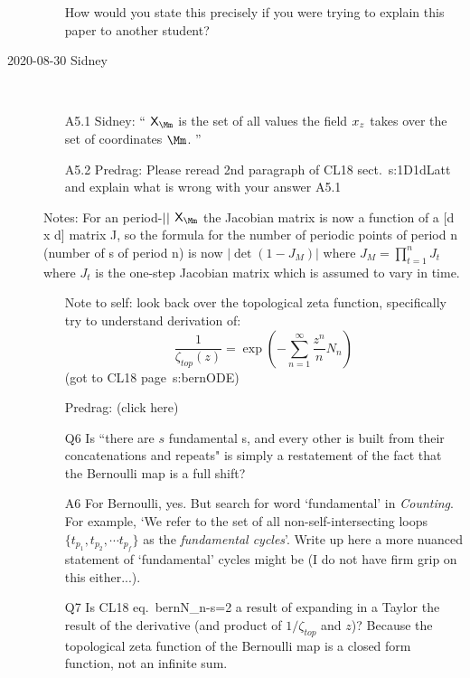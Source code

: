 \begin{description}
\begin{itemize}
How would you state this precisely if you were trying to explain this
paper to another student?
\end{itemize}

\item[2020-08-30 Sidney]~~
\begin{itemize}
  \item[A5.1]
Sidney: ``
$\Xx_\Mm$ is the set of all values the field $x_z$ takes over
the set of coordinates $\Mm$.
''
  \item[A5.2]
Predrag: Please reread 2nd paragraph of CL18 sect.~{s:1D1dLatt} and explain what
is wrong with your answer A5.1
\end{itemize}

\vspace{3mm}

Notes: For an period-${||}$ {\lattstate} $\Xx_\Mm$ the Jacobian
matrix is now a function of a [d x d] matrix J, so the formula for the
number of periodic points of period n (number of {\lattstate}s of period
n) is now $|\det(1-J_M)|$ where $J_M=\prod^n_{t=1}J_t$ where $J_t$ is the
one-step Jacobian matrix which is assumed to vary in time.

\begin{itemize}
	\item[Note to self:]
look back over the topological zeta function, specifically try to
understand derivation of:
\[
\frac{1}{\zeta_{top}(z)}=\exp\left(-\sum^{\infty}_{n=1}\frac{z^n}{n}N_n\right)
\]
(got to CL18 page~{s:bernODE})
	\item[Predrag:]
 {(click here)}
	\item[Q6]
Is ``there are ${s}$ fundamental {\lattstate}s, and every other {\lattstate}
is built from their concatenations and repeats"
is simply a restatement of the fact that the Bernoulli map is a full shift?
	\item[A6]
For Bernoulli, yes. But search for word `fundamental' in
{{\em Counting}}. For example, `We refer to the set of all
non-self-intersecting loops $\{ t_{p_1}, t_{p_2}, \cdots t_{p_f} \}$ as
the {\em fundamental cycles}'. Write up here a more nuanced statement of
`fundamental' cycles might be (I do not have firm grip on this either...).
	\item[Q7]
Is CL18 eq.~{bernN\_n-s=2} a result of expanding in a Taylor the result
of the derivative (and product of $1/\zeta_{top}$ and $z$)? Because the
topological zeta function of the Bernoulli map is a closed form function,
not an infinite sum.
\end{itemize}


\end{description}
